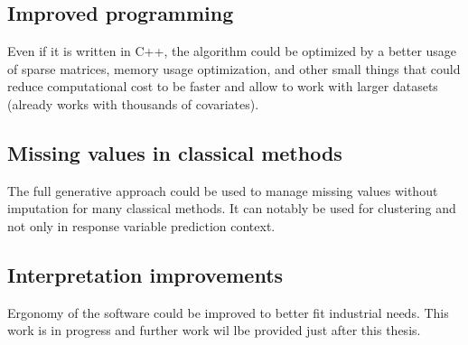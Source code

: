 \documentclass[12pt,a4paper]{report}
\begin{document}
		\subsection{Improved programming}
			Even if it is written in C++, the algorithm could be optimized by a better usage of sparse matrices, memory usage optimization, and other small things that could reduce computational cost to be faster and allow to work with larger datasets (already works with thousands of covariates).
		\subsection{Missing values in classical methods}
			The full generative approach could be used to manage missing values without imputation for many classical methods.
			It can notably be used for clustering and not only in response variable prediction context.
		\subsection{Interpretation improvements}
			Ergonomy of the software could be improved to better fit industrial needs. This work is in progress and further work wil lbe provided just after this thesis.
\cleardoublepage


%
\nocite{*}

%		
%		
%		
%		
%		
%			
\end{document}
